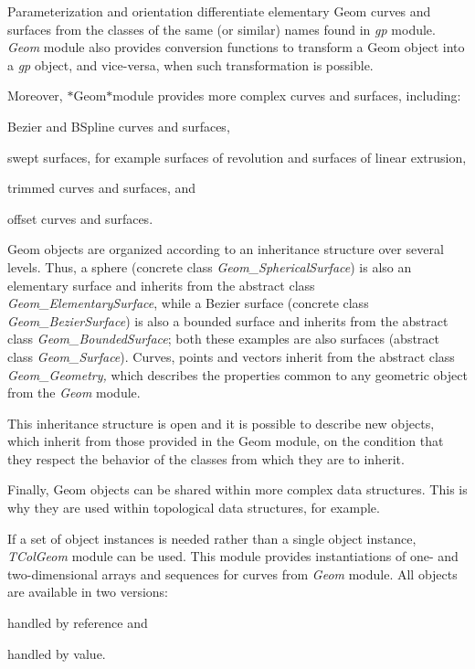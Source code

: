 Parameterization and orientation differentiate elementary Geom curves and surfaces from the classes of the same (or similar) names found in {\itshape gp} module. {\itshape Geom} module also provides conversion functions to transform a Geom object into a {\itshape gp} object, and vice-\/versa, when such transformation is possible.

Moreover, $\ast$\+Geom$\ast$module provides more complex curves and surfaces, including\+:
\begin{DoxyItemize}
\item Bezier and B\+Spline curves and surfaces,
\item swept surfaces, for example surfaces of revolution and surfaces of linear extrusion,
\item trimmed curves and surfaces, and
\item offset curves and surfaces.
\end{DoxyItemize}

Geom objects are organized according to an inheritance structure over several levels. Thus, a sphere (concrete class {\itshape Geom\+\_\+\+Spherical\+Surface}) is also an elementary surface and inherits from the abstract class {\itshape Geom\+\_\+\+Elementary\+Surface}, while a Bezier surface (concrete class {\itshape Geom\+\_\+\+Bezier\+Surface}) is also a bounded surface and inherits from the abstract class {\itshape Geom\+\_\+\+Bounded\+Surface}; both these examples are also surfaces (abstract class {\itshape Geom\+\_\+\+Surface}). Curves, points and vectors inherit from the abstract class {\itshape Geom\+\_\+\+Geometry,} which describes the properties common to any geometric object from the {\itshape Geom} module.

This inheritance structure is open and it is possible to describe new objects, which inherit from those provided in the Geom module, on the condition that they respect the behavior of the classes from which they are to inherit.

Finally, Geom objects can be shared within more complex data structures. This is why they are used within topological data structures, for example.

If a set of object instances is needed rather than a single object instance, {\itshape T\+Col\+Geom} module can be used. This module provides instantiations of one-\/ and two-\/dimensional arrays and sequences for curves from {\itshape Geom} module. All objects are available in two versions\+:
\begin{DoxyItemize}
\item handled by reference and
\item handled by value.
\end{DoxyItemize}

